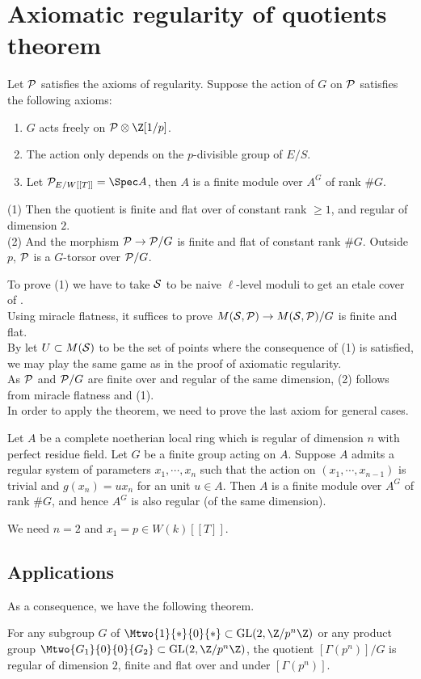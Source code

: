 \section{Axiomatic regularity of quotients theorem}
\begin{theorem}
	Let $\mathcal{P}$ satisfies the axioms of regularity. Suppose the action of $G$ on $\mathcal{P}$ satisfies the following axioms:
	\begin{enumerate}
		\item $G$ acts freely on $\cP\otimes \Z[1/p]$.
		\item The action only depends on the $p$-divisible group of $E/S$.
		\item Let $\cP_{E/W[[T]]}=\Spec A$, then $A$ is a finite module over $A^G$ of rank $\#G$.
	\end{enumerate}
	(1) Then the quotient is finite and flat over \ellr of constant rank $\geq 1$, and regular of dimension $2$. \\
	(2) And the morphism $\mathcal{P}\to \mathcal{P}/G$ is finite and flat of constant rank $\#G$. Outside $p$, $\mathcal{P}$ is a $G$-torsor over $\mathcal{P}/G$.
\end{theorem}
To prove (1) we have to take $\mathcal{S}$ to be naive $\ell$-level moduli to get an etale cover of \ellr.\\
Using miracle flatness, it suffices to prove $M(\mathcal{S},\mathcal{P})\to M(\mathcal{S},\mathcal{P})/G$ is finite and flat. \\
By let $U\subset M(\mathcal{S})$ to be the set of points where the consequence of (1) is satisfied, we may play the same game as in the proof of axiomatic regularity. \\
As $\mathcal{P}$ and $\mathcal{P}/G$ are finite over \ellr and regular of the same dimension, (2) follows from miracle flatness and (1). \\
In order to apply the theorem, we need to prove the last axiom for general cases. \\
\begin{proposition}
	Let $A$ be a complete noetherian local ring which is regular of dimension $n$ with perfect residue field. Let $G$ be a finite group acting on $A$. Suppose $A$ admits a regular system of parameters $x_1,\cdots,x_n$ such that the action on $(x_1,\cdots, x_{n-1})$ is trivial and $g(x_n) = ux_n$ for an unit $u\in A$. Then $A$ is a finite module over $A^G$ of rank $\#G$, and hence $A^G$ is also regular (of the same dimension).
\end{proposition}
We need $n=2$ and $x_1=p\in W(k)[[T]]$.
\subsection{Applications}
As a consequence, we have the following theorem.
\begin{theorem}
	For any subgroup $G$ of $\Mtwo{1}{*}{0}{*}\subset \text{GL}(2,\Z/p^n\Z)$ or any product group $\Mtwo{G_1}{0}{0}{G_2}\subset \text{GL}(2,\Z/p^n\Z)$, the quotient $[\Gamma(p^n)]/G$ is regular of dimension $2$, finite and flat over \ellr and under $[\Gamma(p^n)]$.
\end{theorem}

